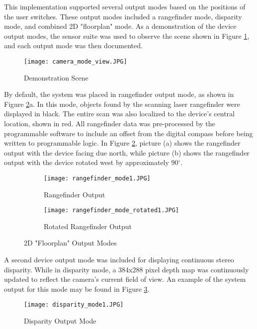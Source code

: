 \par
This implementation supported several output modes based on the positions of the user switches. These output modes included a rangefinder mode, disparity mode, and combined 2D "floorplan" mode. As a demonstration of the device output modes, the sensor suite was used to observe the scene shown in Figure \ref{demoScene}, and each output mode was then documented.
\par
\begin{figure}[H]
	\centerline{
	\texttt{[image: camera\_mode\_view.JPG]}
	}
	\caption{Demonstration Scene}
	\label{demoScene}
\end{figure}
\par
By default, the system was placed in rangefinder output mode, as shown in Figure \ref{rangeOutputs}a. In this mode, objects found by the scanning laser rangefinder were displayed in black. The entire scan was also localized to the device's central location, shown in red. All rangefinder data was pre-processed by the programmable software to include an offset from the digital compass before being written to programmable logic. In Figure \ref{rangeOutputs}, picture (a) shows the rangefinder output with the device facing due north, while picture (b) shows the rangefinder output with the device rotated west by approximately 90$^\circ$.
\par
\begin{figure}[H]
\centering
       \begin{subfigure}[h]{1\textwidth}
            \centerline{\texttt{[image: rangefinder\_mode1.JPG]}}
           \caption{Rangefinder Output}
       \end{subfigure}
       \begin{subfigure}[h]{1\textwidth}
           \centerline{\texttt{[image: rangefinder\_mode\_rotated1.JPG]}}
           \caption{Rotated Rangefinder Output}
       \end{subfigure}
\caption{2D "Floorplan" Output Modes}
\label{rangeOutputs}
\end{figure}
\par
A second device output mode was included for displaying continuous stereo disparity. While in disparity mode, a 384x288 pixel depth map was continuously updated to reflect the camera's current field of view. An example of the system output for this mode may be found in Figure \ref{disparityOutputs}.
\begin{figure}[H]
        \centerline{\texttt{[image: disparity\_mode1.JPG]}}
        \caption{Disparity Output Mode}
        \label{disparityOutputs}
\end{figure}
